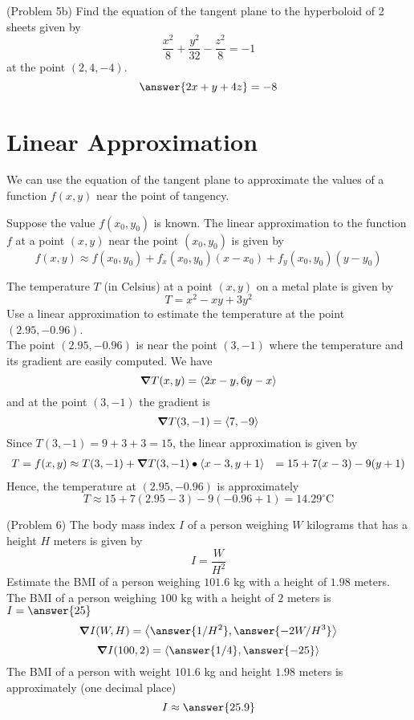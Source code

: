 \documentclass[handout]{ximera}
\begin{document}
\begin{problem}(Problem 5b)
Find the equation of the tangent plane to the hyperboloid of 2 sheets given by 
\[
\frac{x^2}{8} + \frac{y^2}{32} - \frac{z^2}{8} = -1
\]
at the point $(2, 4, -4)$.\\
\[
\answer{2x+y + 4z} = -8
\]
\end{problem}




\section{Linear Approximation}
We can use the equation of the tangent plane to approximate the values of a function $f(x,y)$ near the point of tangency.

Suppose the value $f(x_0, y_0)$ is known. The linear approximation to the function $f$ at a point $(x,y)$ near the point $(x_0, y_0)$
is given by
\[
f(x,y) \approx f(x_0, y_0) + f_x(x_0, y_0)(x-x_0) + f_y(x_0, y_0)(y-y_0)
\]

\begin{example}[Example 6]
The temperature $T$ (in Celsius) at a point $(x,y)$ on a metal plate is given by 
\[
T = x^2 - xy + 3y^2
\]
Use a linear approximation to estimate the temperature at the point $(2.95, -0.96)$.\\
The point $(2.95, -0.96)$ is near the point $(3,-1)$ where the temperature and its gradient are easily computed.
We have
\[
\boldsymbol\nabla T(x,y) = \left\langle 2x - y, 6y - x\right\rangle
\]
and at the point $(3, -1)$ the gradient is
\[
\boldsymbol\nabla T(3, -1) = \left\langle 7, -9\right\rangle
\]
Since $T(3, -1) = 9 + 3 + 3 = 15$, the linear approximation is given by
\begin{align*}
T = f(x,y) &\approx T(3, -1) + \boldsymbol\nabla T(3, -1) \bullet \left\langle x-3, y+1\right\rangle
           &= 15 + 7(x-3) - 9(y+1)\\
\end{align*}
Hence, the temperature at $(2.95, -0.96)$ is approximately
\[
T \approx 15 + 7(2.95 - 3) - 9(-0.96 + 1) = 14.29^\circ \text{C}
\]
\end{example}


\begin{problem}(Problem 6)
The body mass index $I$ of a person weighing $W$ kilograms that has a height $H$ meters is given by
\[
I = \frac{W}{H^2}
\]
Estimate the BMI of a person weighing $101.6$ kg with a height of $1.98$ meters.\\
The BMI of a person weighing $100$ kg with a height of $2$ meters is $I = \answer{25}$
\[
\grad I(W,H) = \vector{\answer{1/H^2}, \answer{-2W/H^3}}
\]
\[
\grad I(100, 2) = \vector{\answer{1/4}, \answer{-25}}
\]
The BMI of a person with weight $101.6$ kg and height $1.98$ meters is approximately (one decimal place)
\[
I \approx \answer{25.9}
\]
\end{problem}
\end{document}
